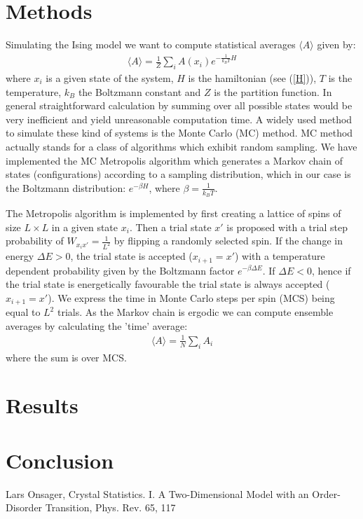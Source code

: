 \documentclass[11pt]{article}
\begin{document}
\section{Methods}
Simulating the Ising model we want to compute statistical averages $\langle A\rangle$ given by:
\begin{align}
\langle A\rangle=\frac{1}{Z}\sum_{i}{A(x_i)e^{-\frac{1}{k_BT}H}}
\end{align}
where $x_i$ is a given state of the system, $H$ is the hamiltonian (see (\ref{H})), $T$ is the temperature, $k_B$ the Boltzmann constant and $Z$ is the partition function. In general straightforward calculation by summing over all possible states would be very inefficient and yield unreasonable computation time. A widely used method to simulate these kind of systems is  the Monte Carlo (MC) method. MC method actually stands for a class of algorithms which exhibit random sampling. We have implemented the MC Metropolis algorithm which generates a Markov chain of states (configurations) according to a sampling distribution, which in our case is the Boltzmann distribution: $e^{-\beta H}$, where $\beta=\frac{1}{k_BT}$. 

The Metropolis algorithm is implemented by first creating a lattice of spins of size $L\times L$ in a given state $x_i$. Then a trial state $x'$ is proposed with a trial step probability of $W_{x_ix'}=\frac{1}{L^2}$ by flipping a randomly selected spin. If the change in energy $\Delta E>0$, the trial state is accepted ($x_{i+1}=x'$) with a temperature dependent probability given by the Boltzmann factor $e^{-\beta\Delta E}$. If $\Delta E<0$, hence if the trial state is energetically favourable the trial state is always accepted ($x_{i+1}=x'$). We express the time in Monte Carlo steps per spin (MCS) being equal to $L^2$ trials. As the Markov chain is ergodic we can compute ensemble averages by calculating the 'time' average:
\begin{align}
\langle A\rangle = \frac{1}{N}\sum_i A_i
\end{align}
where the sum is over MCS. 



\section{Results}


\section{Conclusion}



\begin{thebibliography}{x}
 Lars Onsager, Crystal Statistics. I. A Two-Dimensional Model with an Order-Disorder Transition, Phys. Rev. 65, 117 
\end{thebibliography}
\end{document}

